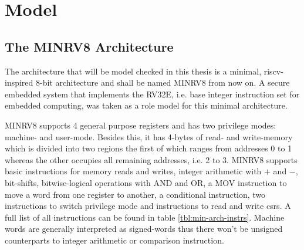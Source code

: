 
\section{Model}
\label{sec:model}


\subsection{The MINRV8 Architecture}
\label{sec:minrv8}

The architecture that will be model checked in this thesis is a minimal, \gls{riscv}-inspired 8-bit architecture and shall be named MINRV8 from now on.
A secure embedded system that implements the RV32E, i.e. base integer instruction set for embedded computing, was taken as a role model for this minimal architecture.

MINRV8 supports 4 general purpose registers and has two privilege modes: machine- and user-mode.
Besides this, it has 4-bytes of read- and write-memory which is divided into two regions the first of which ranges from addresses 0 to 1 whereas the other occupies all remaining addresses, i.e. 2 to 3.
MINRV8 supports basic instructions for memory reads and writes, integer arithmetic with $ + $ and $ - $, bit-shifts, bitwise-logical operations with AND and OR, a MOV instruction to move a word from one register to another, a conditional instruction, two instructions to switch privilege mode and instructions to read and write \glspl{csr}.
A full list of all instructions can be found in table \ref{tbl:min-arch-instrs}.
Machine words are generally interpreted as signed-words thus there won't be unsigned counterparts to integer arithmetic or comparison instruction.

